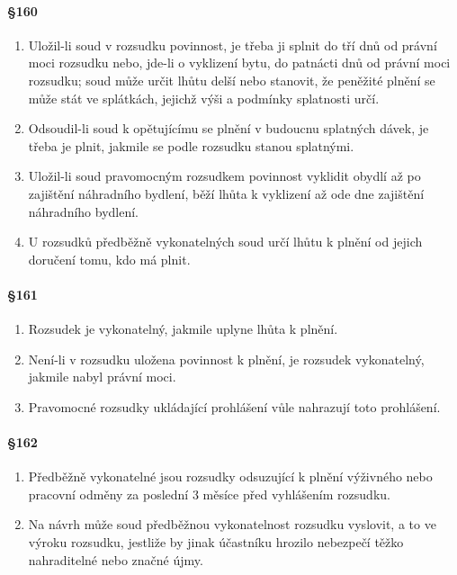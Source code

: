 \paragraph{\S 160}

\begin{enumerate}[label={(\arabic*)}]
  \item Uložil-li soud v rozsudku povinnost, je třeba ji splnit do tří dnů od právní moci rozsudku nebo, jde-li o vyklizení bytu, do patnácti dnů od právní moci rozsudku; soud může určit lhůtu delší nebo stanovit, že peněžité plnění se může stát ve splátkách, jejichž výši a podmínky splatnosti určí.
  \item Odsoudil-li soud k opětujícímu se plnění v budoucnu splatných dávek, je třeba je plnit, jakmile se podle rozsudku stanou splatnými.
  \item Uložil-li soud pravomocným rozsudkem povinnost vyklidit obydlí až po zajištění náhradního bydlení, běží lhůta k vyklizení až ode dne zajištění náhradního bydlení.
  \item U rozsudků předběžně vykonatelných soud určí lhůtu k plnění od jejich doručení tomu, kdo má plnit.
\end{enumerate}

\paragraph{\S 161}

\begin{enumerate}[label={(\arabic*)}]
  \item Rozsudek je vykonatelný, jakmile uplyne lhůta k plnění.
  \item Není-li v rozsudku uložena povinnost k plnění, je rozsudek vykonatelný, jakmile nabyl právní moci.
  \item Pravomocné rozsudky ukládající prohlášení vůle nahrazují toto prohlášení.
\end{enumerate}

\paragraph{\S 162}

\begin{enumerate}[label={(\arabic*)}]
  \item Předběžně vykonatelné jsou rozsudky odsuzující k plnění výživného nebo pracovní odměny za poslední 3 měsíce před vyhlášením rozsudku.
  \item Na návrh může soud předběžnou vykonatelnost rozsudku vyslovit, a to ve výroku rozsudku, jestliže by jinak účastníku hrozilo nebezpečí těžko nahraditelné nebo značné újmy.
\end{enumerate}

